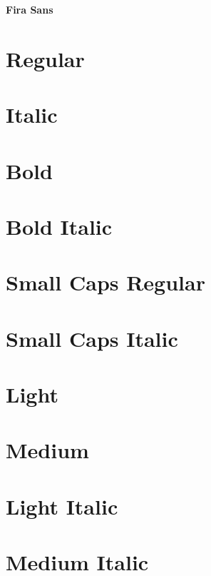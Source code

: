 \documentclass{article}
\begin{document}
\begin{center}\huge\bf Fira Sans
\end{center}


\section*{Regular}
\lipsum[1]

\section*{Italic}
\textit{\lipsum[2]}

\section*{Bold}

\textbf{\lipsum[3]}

\section*{Bold Italic}

\textbf{\textit{\lipsum[4]}}


\section*{Small Caps Regular}

\textsc{\lipsum[5]}

\section*{Small Caps Italic}
\textsc{\textit{\lipsum[6]}}

\section*{Light}
{\firalight \lipsum[7]}

\section*{Medium}
{\firamedium \lipsum[8]}


\section*{Light Italic}
{\firalight \textit{\lipsum[9]}}

\section*{Medium Italic}
{\firamedium \textit{\lipsum[10]}}
\end{document}
